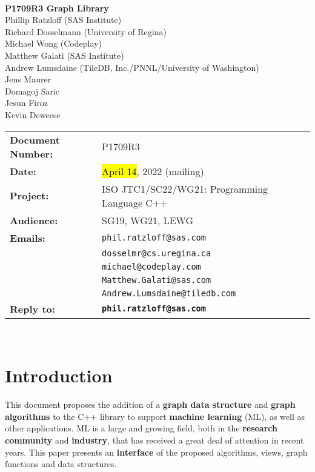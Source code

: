 \documentclass[10pt,onecolumn]{article}
\begin{document}
\begin{titlepage}
~
\vfill
\begin{center}
\LARGE
\textbf{P1709R3 Graph Library}\\
\vspace{12pt}
\normalsize
	Phillip Ratzloff (SAS Institute)\\
	Richard Dosselmann (University of Regina)\\
	Michael Wong (Codeplay)\\
	Matthew Galati (SAS Institute)\\	
	Andrew Lumsdaine (TileDB, Inc./PNNL/University of Washington)\\
	Jens Maurer\\
	Domagoj Saric\\
	Jesun Firoz\\
	Kevin Deweese\\
\end{center}
\vspace{32pt}
\begin{tabular}{ll}
\textbf{Document Number:} & P1709R3\\
\textbf{Date:} & \hl{April 14}, 2022 (mailing)\\ 
\textbf{Project:} & ISO JTC1/SC22/WG21: Programming Language C++\\
\textbf{Audience:} & SG19, WG21, LEWG\\
\textbf{Emails:}
	&\texttt{phil.ratzloff@sas.com}\\
	&\texttt{dosselmr@cs.uregina.ca}\\
	&\texttt{michael@codeplay.com}\\
	&\texttt{Matthew.Galati@sas.com}\\
	&\texttt{Andrew.Lumsdaine@tiledb.com}\\
\textbf{Reply to:}
	&\texttt{\textbf{phil.ratzloff@sas.com}}\\
\end{tabular}
\vfill
~
\end{titlepage}

\tableofcontents

\clearpage

\section{Introduction}
This document proposes the addition of a \textbf{graph data structure} and \textbf{graph algorithms} to the C++ library to support \textbf{machine learning} (ML), as well as other applications. ML is a large and growing field, both in the \textbf{research community} and \textbf{industry}, that has received a great deal of attention in recent years. This paper presents an \textbf{interface} of the proposed algorithms, views, graph functions and data structures.
\end{document}
